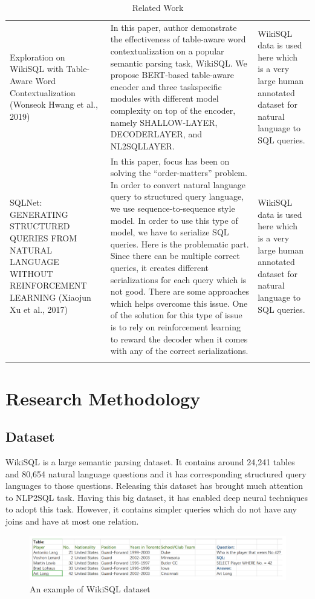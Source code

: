 \documentclass[12pt]{article}
\begin{document}
\begin{longtable}{ | m{4.5cm}| m{6cm} |m{5cm}|}
Exploration on
WikiSQL
with Table-Aware
Word
Contextualization (Wonseok Hwang et al., 2019)  &In this paper, author
demonstrate the effectiveness
of table-aware word
contextualization
on a popular semantic parsing
task, WikiSQL. We propose
BERT-based table-aware
encoder and three taskspecific modules with
different model complexity on
top of the encoder, namely
SHALLOW-LAYER,
DECODERLAYER, and NL2SQLLAYER. &WikiSQL data is used here which
is a very large human annotated
dataset for natural language to
SQL queries.  \\ 
 SQLNet:
GENERATING
STRUCTURED
QUERIES FROM
NATURAL
LANGUAGE
WITHOUT
REINFORCEMENT
LEARNING (Xiaojun Xu et al., 2017)& In this paper, focus has been
on solving the “order-matters”
problem. In order to convert
natural language query to
structured query language, we
use sequence-to-sequence
style model. In order to use
this type of model, we have to
serialize SQL queries. Here is
the problematic part. Since
there can be multiple correct
queries, it creates different
serializations for each query
which is not good. There are
some approaches which helps
overcome this issue. One of
the solution for this type of
issue is to rely on reinforcement learning to
reward the decoder when it
comes with any of the correct
serializations. &WikiSQL data is used here which
is a very large human annotated
dataset for natural language to
SQL queries.  \\ 
 \hline
\caption{Related Work}
\label{relatedwork}
\end{longtable}






\section{Research Methodology}
\subsection{Dataset}
WikiSQL is a large semantic parsing dataset. It contains around 24,241 tables and 80,654 natural language questions and it has corresponding structured query languages to those questions. Releasing this dataset has brought much attention to NLP2SQL task. Having this big dataset, it has enabled deep neural techniques to adopt this task. However, it contains simpler queries which do not have any joins and have at most one relation. 
\begin{figure}[H]
    \includegraphics[width=450pt]{wikisql}
	\caption{An example of WikiSQL dataset}
    \label{fig:WikiSQL}
\end{figure}
\end{document}
